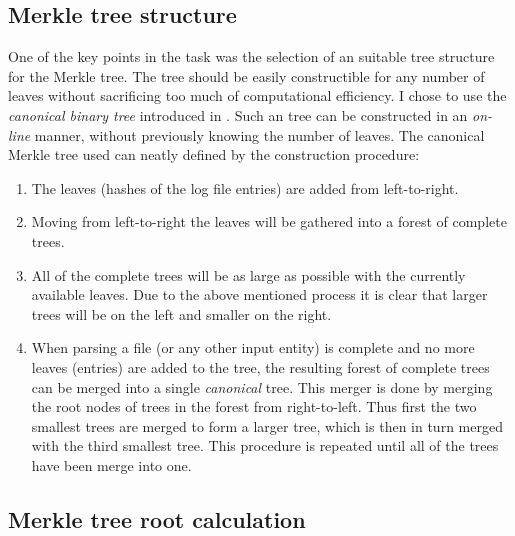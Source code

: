\documentclass[11pt]{article}
\begin{document}
\subsection{Merkle tree structure} %
\label{sub:merkle_tree_structure}

One of the key points in the task was the selection of an suitable tree structure for the Merkle tree. The tree should be easily constructible for any number of leaves without sacrificing too much of computational efficiency. I chose to use the \emph{canonical binary tree} introduced in \cite{Buldas2014}. Such an tree can be constructed in an \emph{on-line} manner, without previously knowing the number of leaves. The canonical Merkle tree used can neatly defined by the construction procedure:

\begin{enumerate}
 	
 	\item The leaves (hashes of the log file entries) are added from left-to-right.
 	
 	\item Moving from left-to-right the leaves will be gathered into a forest of complete trees.
 	
 	\item All of the complete trees will be as large as possible with the currently available leaves. Due to the above mentioned process it is clear that larger trees will be on the left and smaller on the right.

 	\item When parsing a file (or any other input entity) is complete and no more leaves (entries) are added to the tree, the resulting forest of complete trees can be merged into a single \emph{canonical} tree. This merger is done by merging the root nodes of trees in the forest from right-to-left. Thus first the two smallest trees are merged to form a larger tree, which is then in turn merged with the third smallest tree. This procedure is repeated until all of the trees have been merge into one.

\end{enumerate}


\subsection{Merkle tree root calculation} %
\label{sub:merkle_tree_root_calculation}
\end{document}
